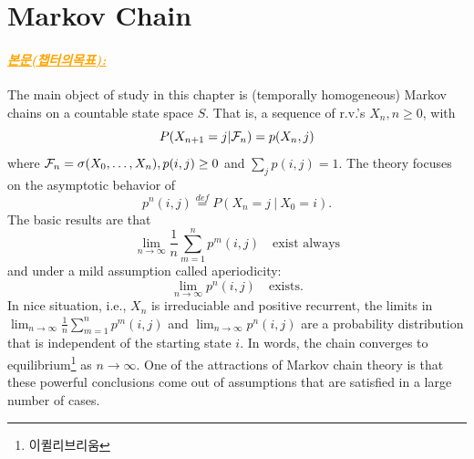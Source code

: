 \documentclass[12pt,oneside,english,a4paper]{article}
\newcommand{\paraorange}[1]{\paragraph{\LARGE\textcolor{orange}{\it\underline{\textbf{#1:}}}}\LARGE}
\begin{document}
\section{Markov Chain}

\paraorange{본문(챕터의목표)} The main object of study in this chapter is (temporally homogeneous) Markov chains on a countable state space $S$. That is, a sequence of r.v.'s $X_n, n\geq 0$, with 
\[
P(X_{n+1}=j | {\cal F}_n)=p(X_n,j)
\]
where ${\cal F}_n=\sigma(X_0,\dots,X_n), p(i,j)\geq 0$ and $\sum_jp(i,j)=1$. The theory focuses on the asymptotic behavior of 
\[
p^n(i,j)\overset{def}{=}P(X_n=j ~|~X_0=i).
\]
The basic results are that 
\[
\lim_{n\to\infty}\frac{1}{n}\sum_{m=1}^{n}p^m(i,j)\quad \mbox{exist always}
\]
and under a mild assumption called aperiodicity: 
\[
\lim_{n\to\infty}p^n(i,j)\quad \mbox{exists.}
\]
In nice situation, i.e., $X_n$ is irreduciable and positive recurrent, the limits in $\lim_{n\to\infty}\frac{1}{n}\sum_{m=1}^{n}p^{m}(i,j)$ and $\lim_{n\to\infty}p^{n}(i,j)$ are a probability distribution that is independent of the starting state $i$. In words, the chain converges to equilibrium\footnote{이퀼리브리움} as $n\to \infty$. One of the attractions of Markov chain theory is that these powerful conclusions come out of assumptions that are satisfied in a large number of cases. 
\end{document}
